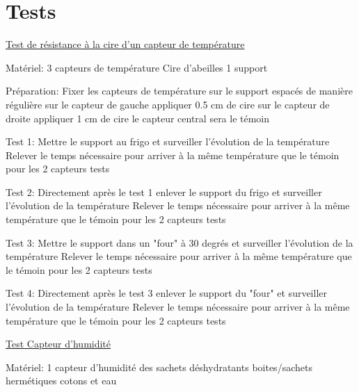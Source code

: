 \chapter{Tests}

\underline{Test de résistance à la cire d'un capteur de température}\newline 

Matériel:  
3 capteurs de température  
Cire d'abeilles  
1 support\newline   

Préparation:  
Fixer les capteurs de température sur le support espacés de manière régulière sur le capteur de gauche appliquer 0.5 cm de cire sur le capteur de droite appliquer 1 cm de cire le capteur central sera le témoin \newline  

Test 1: \newline  
Mettre le support au frigo et surveiller l'évolution de la température\newline   
Relever le temps nécessaire pour arriver à la même température que le témoin pour les 2 capteurs tests  

Test 2:  \newline 
Directement après le test 1 enlever le support du frigo et surveiller l'évolution de la température\newline   
Relever le temps nécessaire pour arriver à la même température que le témoin pour les 2 capteurs tests

Test 3:  \newline 
Mettre le support dans un "four" à 30 degrés et surveiller l'évolution de la température\newline   
Relever le temps nécessaire pour arriver à la même température que le témoin pour les 2 capteurs tests  

Test 4:  \newline 
Directement après le test 3 enlever le support du "four" et surveiller l'évolution de la température\newline   
Relever le temps nécessaire pour arriver à la même température que le témoin pour les 2 capteurs tests \newline 

\underline{Test Capteur d'humidité}\newline 

Matériel: 
1 capteur d'humidité des sachets déshydratants boites/sachets hermétiques cotons et eau \newline 

